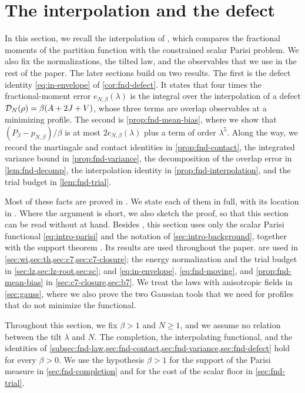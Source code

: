 \chapter{The interpolation and the defect}\label{sec:fnd}

In this section, we recall the interpolation of \cite[Section~2]{AL},
which compares the fractional moments of the partition function with the
constrained scalar Parisi problem. We also fix the normalizations, the
tilted law, and the observables that we use in the rest of the
paper. The later sections build on two results. The first is the
defect identity \eqref{eq:in-envelope} of \cref{cor:fnd-defect}. It states
that four times the fractional-moment error $e_{N,\beta}(\lambda)$
is the integral over the interpolation of a defect
$\mathcal D_N(\rho)=\beta(A+2J+V)$, whose three terms are overlap observables
at a minimizing profile. The second is \cref{prop:fnd-mean-bias}, where
we show that $(P_\beta-p_{N,\beta})/\beta$ is at
most $2e_{N,\beta}(\lambda)$ plus a term of order $\lambda^5$. Along the
way, we record the martingale and contact identities in
\cref{prop:fnd-contact}, the integrated variance bound in
\cref{prop:fnd-variance}, the decomposition of the overlap error in
\cref{lem:fnd-decomp}, the interpolation identity in
\cref{prop:fnd-interpolation}, and the trial budget in
\cref{lem:fnd-trial}.

Most of these facts are proved in \cite{AL}. We state each of them in
full, with its location in \cite{AL}. Where the argument is short, we
also sketch the proof, so that this section can be read without \cite{AL}
at hand. Besides \cite{AL}, this section uses only the scalar Parisi
functional \eqref{eq:intro-parisi} and the notation of
\cref{sec:intro-background}, together with the support theorem
\cite[Theorem~1.1]{Lopatto}. Its results are used throughout the
paper.  are
used in \cref{sec:wi,sec:th,sec:c7,sec:c7-closure}; the energy
normalization and the trial budget in \cref{sec:lz,sec:lz-root,sec:sc};
and \eqref{eq:in-envelope}, \eqref{eq:fnd-moving}, and
\cref{prop:fnd-mean-bias} in \cref{sec:c7-closure,sec:b7}. We treat the
laws with anisotropic fields in \cref{sec:gauss}, where we
also prove the two Gaussian tools that we need for profiles that do not
minimize the functional.

Throughout this section, we fix $\beta>1$ and $N\ge1$, and we assume no
relation between the tilt $\lambda$ and $N$. The completion,
the interpolating functional, and the identities of
\cref{subsec:fnd-law,sec:fnd-contact,sec:fnd-variance,sec:fnd-defect}
hold for every $\beta>0$. We use the hypothesis $\beta>1$ for the support
of the Parisi measure in \cref{sec:fnd-completion} and for the
cost of the scalar floor in \cref{sec:fnd-trial}.

